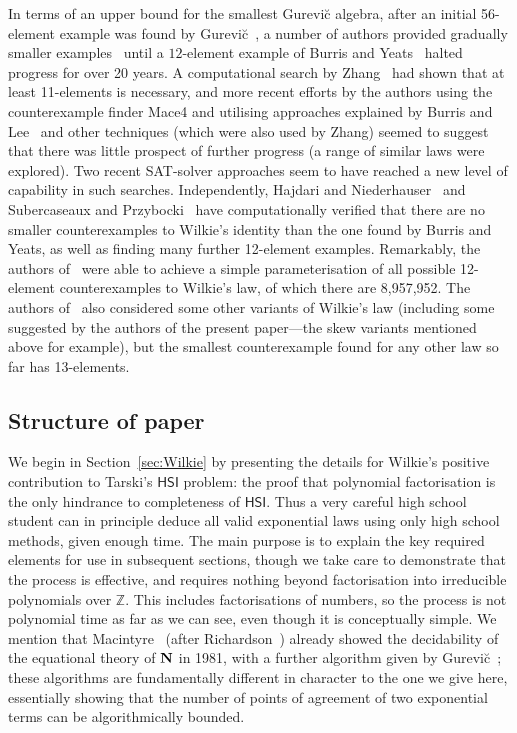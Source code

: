 \documentclass[eqnor,reqno]{amsart}
\theoremstyle{plain}
\theoremstyle{definition}
\newcommand{\HSI}{\textsf{HSI}}
\begin{document}
In terms of an upper bound for the smallest Gurevi\u{c} algebra, after an initial 56-element example was found by Gurevi\u{c}~\cite{gur85}, a number of authors provided gradually smaller examples~\cite{burlee92,gur90,jac96} until a $12$-element example of Burris and Yeats~\cite{buryea} halted progress for over 20 years.  
A computational search by Zhang~\cite{zha} had shown that at least 11-elements is necessary, and more recent efforts by the authors using the counterexample finder Mace4 and utilising approaches explained by Burris and Lee~\cite{burlee92} and other techniques (which were also used by Zhang) seemed to suggest that there was little prospect of further progress (a range of similar laws were explored).
Two recent SAT-solver approaches seem to have reached a new level of capability in such searches.  Independently, Hajdari and Niederhauser~\cite{hajnie} and Subercaseaux and Przybocki~\cite{subprz} have computationally verified that there are no smaller counterexamples to Wilkie's identity than the one found by Burris and Yeats, as well as finding many further 12-element examples. 
Remarkably, the authors of~\cite{subprz} were able to achieve a simple parameterisation of all possible 12-element counterexamples to Wilkie's law, of which there are 8,957,952.  
The authors of~\cite{subprz} also considered some other variants of  Wilkie's law (including some suggested by the authors of the present paper---the skew variants mentioned above for example), but the smallest counterexample found for any other law so far has 13-elements.


\subsection{Structure of paper}
We begin in Section~\ref{sec:Wilkie} by presenting the details for Wilkie's positive contribution to Tarski's $\HSI$ problem: the proof that polynomial factorisation is the only hindrance to completeness of $\HSI$.  
Thus a very careful high school student can in principle deduce all valid exponential laws using only high school methods, given enough time.  
The main purpose is to explain the key required elements for use in subsequent sections, though we take care to demonstrate that the process is effective, and requires nothing beyond factorisation into irreducible polynomials over $\mathbb{Z}$.  
This includes factorisations of numbers, so the process is not polynomial time as far as we can see, even though it is conceptually simple.
We mention that Macintyre~\cite{mac} (after Richardson~\cite{ric}) already showed the decidability of the equational theory of ${\bf N}$ in 1981, with a further algorithm given by Gurevi\u{c}~\cite{gur85}; these algorithms are fundamentally different in character to the one we give here, essentially showing that the number of points of agreement of two exponential terms can be algorithmically bounded.
\end{document}
